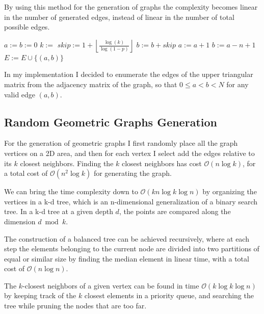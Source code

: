 \documentclass{article}
\begin{document}
By using this method for the generation of graphs the complexity becomes linear in the number of generated edges, instead of linear in the number of total possible edges.

\begin{algorithm}
    \begin{algorithmic}
         
            \State $a:= b := 0$
                \State $k := $ 
                \State $skip := 1 + \left\lfloor\frac{\log(k)}{\log(1-p)}\right\rfloor$
                \State $b := b + skip$
                    \State $a := a + 1$
                    \State $b := a - n + 1$
                \EndWhile
                 \Return
                \EndIf
                \State $E := E \cup \{(a,b)\}$
            \EndWhile
        \EndFunction
    \end{algorithmic}
\end{algorithm}

In my implementation I decided to enumerate the edges of the upper triangular matrix from the adjacency matrix of the graph, so that $0 \leq a < b < N$ for any valid edge $(a, b)$.

\subsection{Random Geometric Graphs Generation}

For the generation of geometric graphs I first randomly place all the graph vertices on a 2D area, and then for each vertex I select add the edges relative to its $k$ closest neighbors. Finding the $k$ closest neighbors has cost $\mathcal O(n\log k)$, for a total cost of $\mathcal O(n^2\log k)$ for generating the graph.

We can bring the time complexity down to $\mathcal O(kn\log k\log n)$ by organizing the vertices in a k-d tree, which is an n-dimensional generalization of a binary search tree. In a k-d tree at a given depth $d$, the points are compared along the dimension $d \bmod k$.

The construction of a balanced tree can be achieved recursively, where at each step the elements belonging to the current node are divided into two partitions of equal or similar size by finding the median element in linear time, with a total cost of $\mathcal O(n\log n)$.

The $k$-closest neighbors of a given vertex can be found in time $\mathcal O(k\log k\log n)$ by keeping track of the $k$ closest elements in a priority queue, and searching the tree while pruning the nodes that are too far.
\end{document}
